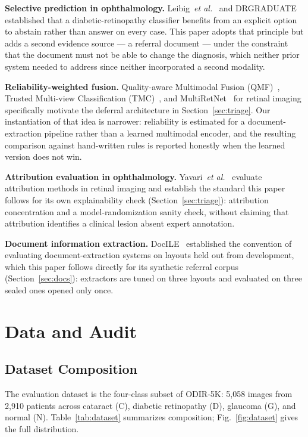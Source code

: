 \documentclass[conference]{IEEEtran}
\begin{document}
\textbf{Selective prediction in ophthalmology.} Leibig~\emph{et
al.}~\cite{leibig2017} and DR\textbar GRADUATE~\cite{araujo2020} established
that a diabetic-retinopathy classifier benefits from an explicit option to
abstain rather than answer on every case. This paper adopts that principle
but adds a second evidence source --- a referral document --- under the
constraint that the document must not be able to change the diagnosis,
which neither prior system needed to address since neither incorporated a
second modality.

\textbf{Reliability-weighted fusion.} Quality-aware Multimodal Fusion
(QMF)~\cite{zhang2023qmf}, Trusted Multi-view Classification
(TMC)~\cite{han2021tmc}, and MultiRetNet~\cite{she2025multiretnet} for
retinal imaging specifically motivate the deferral architecture in
Section~\ref{sec:triage}. Our instantiation of that idea is narrower:
reliability is estimated for a document-extraction pipeline rather than a
learned multimodal encoder, and the resulting comparison against
hand-written rules is reported honestly when the learned version does not
win.

\textbf{Attribution evaluation in ophthalmology.} Yavari~\emph{et
al.}~\cite{yavari2026} evaluate attribution methods in retinal imaging and
establish the standard this paper follows for its own explainability check
(Section~\ref{sec:triage}): attribution concentration and a
model-randomization sanity check, without claiming that attribution
identifies a clinical lesion absent expert annotation.

\textbf{Document information extraction.} DocILE~\cite{simsa2023docile}
established the convention of evaluating document-extraction systems on
layouts held out from development, which this paper follows directly for
its synthetic referral corpus (Section~\ref{sec:docs}): extractors are
tuned on three layouts and evaluated on three sealed ones opened only once.

\section{Data and Audit}
\label{sec:audit}

\subsection{Dataset Composition}

The evaluation dataset is the four-class subset of ODIR-5K: 5{,}058 images
from 2{,}910 patients across cataract (C), diabetic retinopathy (D),
glaucoma (G), and normal (N). Table~\ref{tab:dataset} summarizes
composition; Fig.~\ref{fig:dataset} gives the full distribution.
\end{document}
